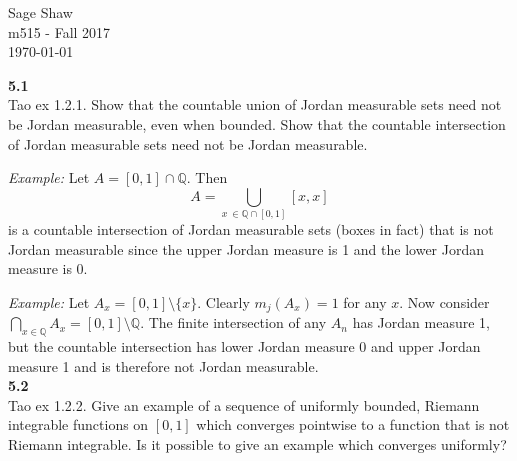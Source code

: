 \documentclass[12pt]{article}
\newcommand{\problem}[1]{\hspace{-4 ex} \large \textbf{#1}\\}
\begin{document}
	\thispagestyle{empty}
	
	\begin{flushright}
		Sage Shaw \\
		m515 - Fall 2017 \\
		\today
	\end{flushright}
	

\problem{5.1} Tao ex 1.2.1. Show that the countable union of Jordan measurable sets need not be Jordan measurable, even when bounded. Show that the countable intersection of Jordan measurable sets need not be Jordan measurable.

	\textit{Example:} Let $A = [0,1] \cap \mathbb{Q}$. Then $$A = \bigcup\limits_{x\ \in \mathbb{Q} \cap [0,1]}[x,x]$$ is a countable intersection of Jordan measurable sets (boxes in fact) that is not Jordan measurable since the upper Jordan measure is 1 and the lower Jordan measure is 0. \bigbreak

	\textit{Example:} Let $A_x = [0,1]\setminus\{x\}$. Clearly $m_j(A_x)=1$ for any $x$. Now consider $\bigcap\limits_{x \in \mathbb{Q}}A_x = [0,1] \setminus \mathbb{Q}$. The finite intersection of any $A_n$ has Jordan measure 1, but the countable intersection has lower Jordan measure 0 and upper Jordan measure 1 and is therefore not Jordan measurable.\\
	
	
\problem{5.2} Tao ex 1.2.2. Give an example of a sequence of uniformly bounded, Riemann integrable functions on $[0,1]$ which converges pointwise to a function that is not Riemann integrable. Is it possible to give an example which converges uniformly?

\end{document}
